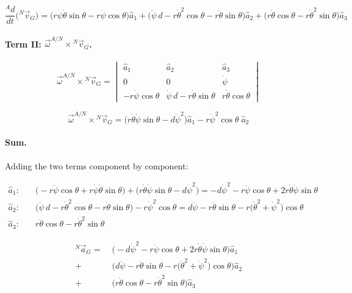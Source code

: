 \documentclass[11pt]{article}
\begin{document}
\[
    \frac{{}^{A}d}{dt}\big({}^{N}\vec v_G\big) =
    \big(r\dot\psi\dot\theta\sin\theta - r\ddot\psi\cos\theta\big)\hat a_1
    + \big(\ddot\psi\, d - r\dot\theta^{2}\cos\theta - r\ddot\theta\sin\theta\big)\hat a_2
    + \big(r\ddot\theta\cos\theta - r\dot\theta^{2}\sin\theta\big)\hat a_3
\]

\paragraph{Term II: $\vec\omega^{A/N}\times {}^{N}\vec v_G$.}
\[
    \vec\omega^{A/N}\times {}^{N}\vec v_G =
    \begin{vmatrix}
        \hat a_1 & \hat a_2 & \hat a_3\\
        0 & 0 & \dot\psi\\
        -r\dot\psi\cos\theta & \dot\psi\, d - r\dot\theta\sin\theta & r\dot\theta\cos\theta
    \end{vmatrix}
\]

\[
    \vec\omega^{A/N}\times {}^{N}\vec v_G =
    \big(r\dot\theta\dot\psi\sin\theta - d\dot\psi^{2}\big)\hat a_1
    - r\dot\psi^{2}\cos\theta\;\hat a_2
\]

\paragraph{Sum.} Adding the two terms component by component:

\begin{align*}
    \hat a_1: &\quad
        \big(-r\ddot\psi\cos\theta + r\dot\psi\dot\theta\sin\theta\big)
        + \big(r\dot\theta\dot\psi\sin\theta - d\dot\psi^{2}\big)
        = -d\dot\psi^{2} - r\ddot\psi\cos\theta + 2r\dot\theta\dot\psi\sin\theta \\[4pt]
    \hat a_2: &\quad
        \big(\ddot\psi\, d - r\dot\theta^{2}\cos\theta - r\ddot\theta\sin\theta\big)
        - r\dot\psi^{2}\cos\theta
        = d\ddot\psi - r\ddot\theta\sin\theta - r\big(\dot\theta^{2}+\dot\psi^{2}\big)\cos\theta \\[4pt]
    \hat a_3: &\quad
        r\ddot\theta\cos\theta - r\dot\theta^{2}\sin\theta
\end{align*}

\begin{result}
\begin{align*}
    {}^{N}\vec a_G =\;
    &\Big(-d\dot\psi^{2} - r\ddot\psi\cos\theta + 2r\dot\theta\dot\psi\sin\theta\Big)\hat a_1 \\
    +\;&\Big(d\ddot\psi - r\ddot\theta\sin\theta - r\big(\dot\theta^{2}+\dot\psi^{2}\big)\cos\theta\Big)\hat a_2 \\
    +\;&\Big(r\ddot\theta\cos\theta - r\dot\theta^{2}\sin\theta\Big)\hat a_3
\end{align*}
\end{result}
\end{document}
